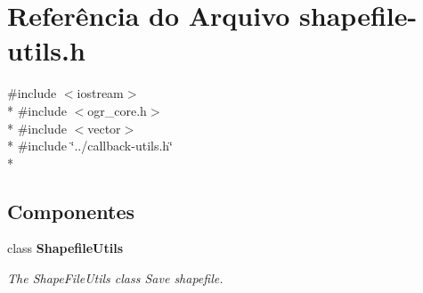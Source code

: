 \section{Referência do Arquivo shapefile-\/utils.h}
\label{shapefile-utils_8h}
{\ttfamily \#include $<$iostream$>$}\\*
{\ttfamily \#include $<$ogr\+\_\+core.\+h$>$}\\*
{\ttfamily \#include $<$vector$>$}\\*
{\ttfamily \#include \char`\"{}../callback-\/utils.\+h\char`\"{}}\\*
\subsection*{Componentes}
\begin{DoxyCompactItemize}
\item 
class {\bf Shapefile\+Utils}
\begin{DoxyCompactList}\small\item\em The Shape\+File\+Utils class  Save shapefile. \end{DoxyCompactList}\end{DoxyCompactItemize}
